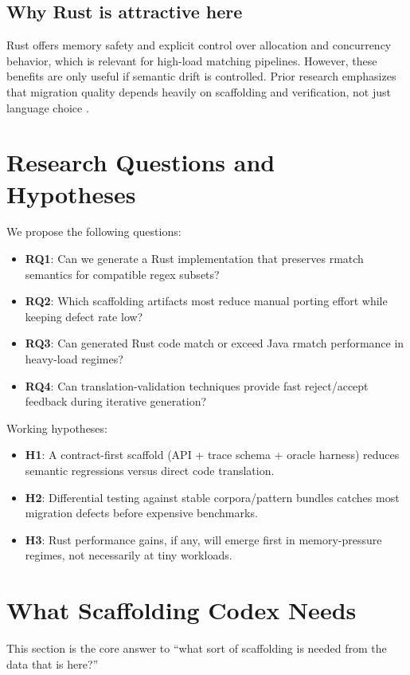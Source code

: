 \documentclass[11pt]{article}
\begin{document}
\subsection{Why Rust is attractive here}
Rust offers memory safety and explicit control over allocation and concurrency behavior, which is relevant for high-load matching pipelines. However, these benefits are only useful if semantic drift is controlled. Prior research emphasizes that migration quality depends heavily on scaffolding and verification, not just language choice \cite{c2rust2025cacm,rustmap2025,c2rustbench2025}.

\section{Research Questions and Hypotheses}
We propose the following questions:
\begin{itemize}
  \item \textbf{RQ1}: Can we generate a Rust implementation that preserves rmatch semantics for compatible regex subsets?
  \item \textbf{RQ2}: Which scaffolding artifacts most reduce manual porting effort while keeping defect rate low?
  \item \textbf{RQ3}: Can generated Rust code match or exceed Java rmatch performance in heavy-load regimes?
  \item \textbf{RQ4}: Can translation-validation techniques provide fast reject/accept feedback during iterative generation?
\end{itemize}

Working hypotheses:
\begin{itemize}
  \item \textbf{H1}: A contract-first scaffold (API + trace schema + oracle harness) reduces semantic regressions versus direct code translation.
  \item \textbf{H2}: Differential testing against stable corpora/pattern bundles catches most migration defects before expensive benchmarks.
  \item \textbf{H3}: Rust performance gains, if any, will emerge first in memory-pressure regimes, not necessarily at tiny workloads.
\end{itemize}

\section{What Scaffolding Codex Needs}
This section is the core answer to ``what sort of scaffolding is needed from the data that is here?''
\end{document}
